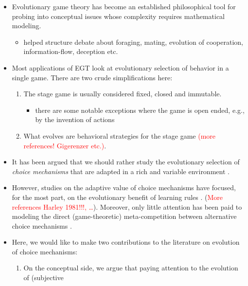 \documentclass[fleqn,reqno,11pt]{article}
\newcommand{\myalert}[1]{\textcolor{red}{#1}}
\begin{document}
\begin{itemize}
\item Evolutionary game theory has become an established philosophical tool for probing into
  conceptual issues whose complexity requires mathematical modeling.
  \begin{itemize}
  \item helped structure debate about foraging, mating, evolution of cooperation,
    information-flow, deception etc.
  \end{itemize}
\item Most applications of EGT look at evolutionary selection of behavior in a single
  game. There are two crude simplifications here:
  \begin{enumerate}
  \item The stage game is usually considered fixed, closed and immutable.
    \begin{itemize}
    \item there are some notable exceptions where the game is open ended, e.g., by the
      invention of actions \citep{WordenLevin2007:Evolutionary-es,
        McKenzie-AlexanderSkymrs2012:Inventing-New-S}
    \end{itemize}
  \item What evolves are behavioral strategies for the stage game \citep[what][call the
    ``behavioral gamit'']{FawcettHamblin2013:Exposing-the-be} \myalert{(more references!
      Gigerenzer etc.)}.
  \end{enumerate}
\item It has been argued that we should rather study the evolutionary selection of \emph{choice
    mechanisms} that are adapted in a rich and variable environment
  \citep[e.g.][]{FawcettHamblin2013:Exposing-the-be,McNamara2013:Towards-a-Riche}.
\item However, studies on the adaptive value of choice mechanisms have focused, for the most
  part, on the evolutionary benefit of learning rules
  \citep[e.g.][]{ZollmanSmead2010:Plasticity-and-,SmeadZollman2013:The-Stability-o}. (\myalert{More references Harley 1981!!!, \dots}). 
    Moreover, only little attention has been paid to
  modeling the direct (game-theoretic) meta-competition between alternative choice mechanisms
  \citep[see][for related criticism]{FawcettHamblin2013:Exposing-the-be}.
\item Here, we would like to make two contributions to the literature on evolution of choice
  mechanisms:
  \begin{enumerate}
  \item On the conceptual side, we argue that paying attention to the evolution of (subjective

\end{enumerate}
\end{itemize}
\end{document}
